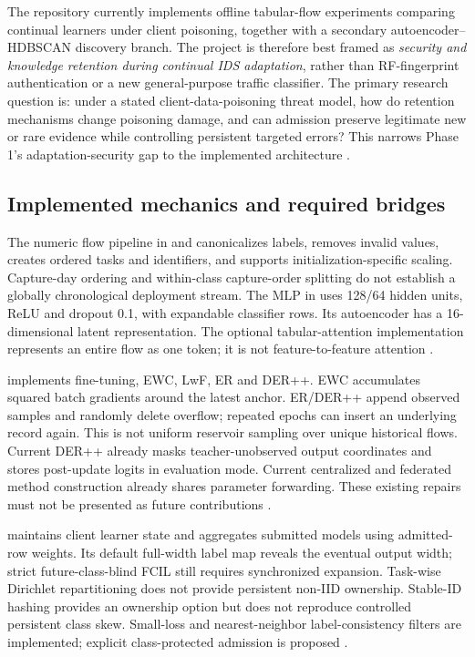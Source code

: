 \documentclass[10pt,a4paper]{article}
\begin{document}
The repository currently implements offline tabular-flow experiments comparing continual learners under client poisoning, together with a secondary autoencoder--HDBSCAN discovery branch. The project is therefore best framed as \emph{security and knowledge retention during continual IDS adaptation}, rather than RF-fingerprint authentication or a new general-purpose traffic classifier. The primary research question is: under a stated client-data-poisoning threat model, how do retention mechanisms change poisoning damage, and can admission preserve legitimate new or rare evidence while controlling persistent targeted errors? This narrows Phase 1's adaptation-security gap to the implemented architecture \cite{phase1,repo}.

\subsection{Implemented mechanics and required bridges}
The numeric flow pipeline in  and  canonicalizes labels, removes invalid values, creates ordered tasks and identifiers, and supports initialization-specific scaling. Capture-day ordering and within-class capture-order splitting do not establish a globally chronological deployment stream. The MLP in  uses 128/64 hidden units, ReLU and dropout 0.1, with expandable classifier rows. Its autoencoder has a 16-dimensional latent representation. The optional tabular-attention implementation represents an entire flow as one token; it is not feature-to-feature attention \cite{repo}.

 implements fine-tuning, EWC, LwF, ER and DER++. EWC accumulates squared batch gradients around the latest anchor. ER/DER++ append observed samples and randomly delete overflow; repeated epochs can insert an underlying record again. This is not uniform reservoir sampling over unique historical flows. Current DER++ already masks teacher-unobserved output coordinates and stores post-update logits in evaluation mode. Current centralized and federated method construction already shares parameter forwarding. These existing repairs must not be presented as future contributions \cite{repo}.

 maintains client learner state and aggregates submitted models using admitted-row weights. Its default full-width label map reveals the eventual output width; strict future-class-blind FCIL still requires synchronized expansion. Task-wise Dirichlet repartitioning does not provide persistent non-IID ownership. Stable-ID hashing provides an ownership option but does not reproduce controlled persistent class skew. Small-loss and nearest-neighbor label-consistency filters are implemented; explicit class-protected admission is proposed \cite{repo}.
\end{document}
